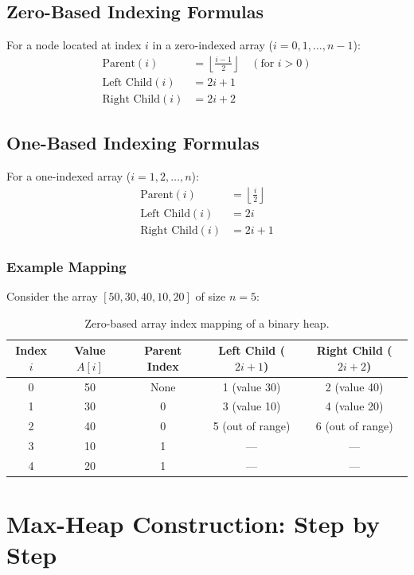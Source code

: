 \subsection{Zero-Based Indexing Formulas}
For a node located at index $i$ in a zero-indexed array ($i = 0, 1, \dots, n-1$):
\begin{align*}
\text{Parent}(i) &= \left\lfloor \frac{i - 1}{2} \right\rfloor \quad (\text{for } i > 0) \\
\text{Left Child}(i) &= 2i + 1 \\
\text{Right Child}(i) &= 2i + 2
\end{align*}

\subsection{One-Based Indexing Formulas}
For a one-indexed array ($i = 1, 2, \dots, n$):
\begin{align*}
\text{Parent}(i) &= \left\lfloor \frac{i}{2} \right\rfloor \\
\text{Left Child}(i) &= 2i \\
\text{Right Child}(i) &= 2i + 1
\end{align*}

\subsubsection{Example Mapping}
Consider the array $[50, 30, 40, 10, 20]$ of size $n=5$:
\begin{table}[htbp]
\centering
\small
\begin{tabular}{ccccc}
\toprule
\textbf{Index $i$} & \textbf{Value $A[i]$} & \textbf{Parent Index} & \textbf{Left Child ($2i+1$)} & \textbf{Right Child ($2i+2$)} \\
\midrule
0 & 50 & None & 1 (value 30) & 2 (value 40) \\
1 & 30 & 0    & 3 (value 10) & 4 (value 20) \\
2 & 40 & 0    & 5 (out of range) & 6 (out of range) \\
3 & 10 & 1    & --- & --- \\
4 & 20 & 1    & --- & --- \\
\bottomrule
\end{tabular}
\caption{Zero-based array index mapping of a binary heap.}
\end{table}

\section{Max-Heap Construction: Step by Step}

